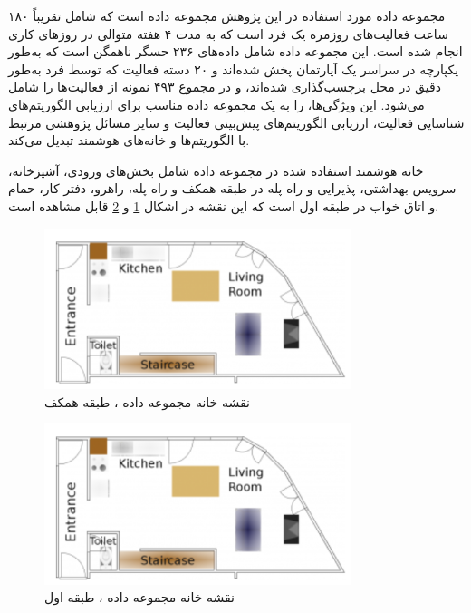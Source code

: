 مجموعه داده مورد استفاده در این پژوهش مجموعه داده  \cite{xyz6} است که شامل تقریباً ۱۸۰ ساعت فعالیت‌های روزمره یک فرد است که به مدت ۴ هفته متوالی در روزهای کاری انجام شده است. این مجموعه داده شامل داده‌های ۲۳۶ حسگر ناهمگن است که به‌طور یکپارچه در سراسر یک آپارتمان پخش شده‌اند و ۲۰ دسته فعالیت که توسط فرد به‌طور دقیق در محل برچسب‌گذاری شده‌اند، و در مجموع ۴۹۳ نمونه از فعالیت‌ها را شامل می‌شود. این ویژگی‌ها،  را به یک مجموعه داده مناسب برای ارزیابی الگوریتم‌های شناسایی فعالیت، ارزیابی الگوریتم‌های پیش‌بینی فعالیت و سایر مسائل پژوهشی مرتبط با الگوریتم‌ها و خانه‌های هوشمند تبدیل می‌کند.

خانه هوشمند استفاده شده در مجموعه داده  شامل بخش‌های ورودی، آشپزخانه، سرویس بهداشتی، پذیرایی و راه پله در طبقه همکف و راه پله، راهرو، دفتر کار، حمام و اتاق خواب در طبقه اول است که این نقشه در اشکال \ref{fig:fO4H1} و  \ref{fig:fO4H2} قابل مشاهده است.

\begin{figure}[H]
\centerline{\includegraphics[width=0.8\textwidth]{figs/fO4H1.png}}
\caption[نقشه خانه مجموعه داده ، طبقه همکف]{نقشه خانه مجموعه داده ، طبقه همکف \cite{xyz6}}
\label{fig:fO4H1}
\end{figure}

\begin{figure}[H]
\centerline{\includegraphics[width=0.8\textwidth]{figs/fO4H1.png}}
\caption[نقشه خانه مجموعه داده ، طبقه اول]{نقشه خانه مجموعه داده ، طبقه اول \cite{xyz6}}
\label{fig:fO4H2}
\end{figure}

